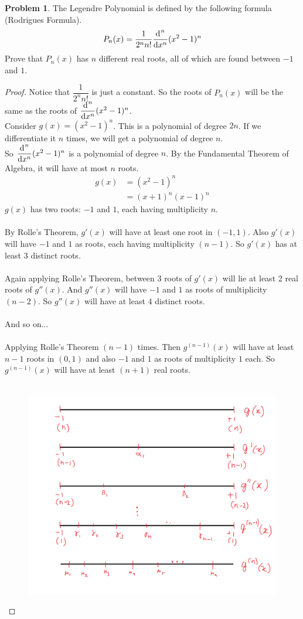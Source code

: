 \documentclass[14]{article}
\theoremstyle{definition}
\newtheorem{prob}{Problem}
\theoremstyle{case}
\begin{document}
\begin{prob}
The Legendre Polynomial is defined by the following formula (Rodrigues Formula).
\[P_n(x) = \dfrac{1}{2^n n!} \dfrac{\dif^{\;n}}{\dif x^n} (x^2 - 1)^n\]
Prove that $P_n(x)$ has $n$ different real roots, all of which are found between $-1$ and $1$.
\begin{proof}
Notice that $\dfrac{1}{2^n n!}$ is just a constant. So the roots of $P_n(x)$ will be the same as the roots of $\dfrac{\dif^{\;n}}{\dif x^n} (x^2 - 1)^n$.\\
Consider $g(x) = (x^2 - 1)^n$. This is a polynomial of degree $2n$. If we differentiate it $n$ times, we will get a polynomial of degree $n$.\\
So $\dfrac{\dif^{\;n}}{\dif x^n} (x^2 - 1)^n$ is a polynomial of degree $n$.
By the Fundamental Theorem of Algebra, it will have at most $n$ roots.\\
\begin{align*}
g(x) &=  (x^2 - 1)^n\\
&= (x+1)^n(x-1)^n
\end{align*}
$g(x)$ has two roots: $-1$ and $1$, each having multiplicity $n$.\\\\
By Rolle's Theorem, $g'(x)$ will have at least one root in $(-1, 1)$. Also $g'(x)$ will have $-1$ and $1$ as roots, each having multiplicity $(n-1)$. So $g'(x)$ has at least $3$ distinct roots.\\\\
Again applying Rolle's Theorem, between 3 roots of $g'(x)$ will lie at least 2 real roots of $g''(x)$. And $g''(x)$ will have $-1$ and $1$ as roots of multiplicity $(n-2)$. So $g''(x)$ will have at least $4$ distinct roots.\\\\
And so on...\\\\
Applying Rolle's Theorem $(n-1)$ times. Then $g^{(n-1)}(x)$ will have at least $n-1$ roots in $(0, 1)$ and also $-1$ and $1$ as roots of multiplicity $1$ each. So $g^{(n-1)}(x)$ will have at least $(n + 1)$ real roots.\\\\
\begin{figure}[h]
\includegraphics[scale=0.35]{images/legendre}

\end{figure}
\end{proof}
\end{prob}
\end{document}
